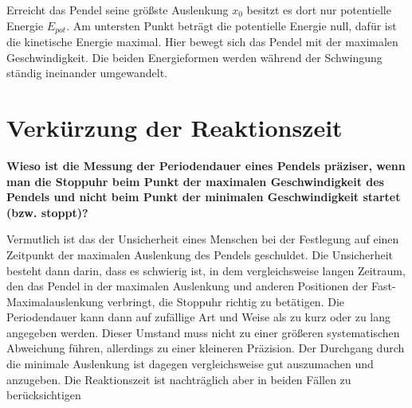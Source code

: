 \documentclass[a4paper, 12pt]{article}
\begin{document}
Erreicht das Pendel seine größste Auslenkung $x_0$ besitzt es dort nur potentielle Energie $E_{pot}$. Am untersten Punkt beträgt die potentielle Energie null, dafür ist die kinetische Energie maximal. Hier bewegt sich das Pendel mit der maximalen Geschwindigkeit. Die beiden Energieformen werden während der Schwingung ständig ineinander umgewandelt.

\section{Verkürzung der Reaktionszeit}
\textbf{Wieso ist die Messung der Periodendauer eines Pendels präziser, wenn man die Stoppuhr beim Punkt der maximalen Geschwindigkeit des Pendels und nicht beim Punkt der minimalen Geschwindigkeit startet (bzw. stoppt)?}

Vermutlich ist das der Unsicherheit eines Menschen bei der Festlegung auf einen Zeitpunkt der maximalen Auslenkung des Pendels geschuldet. Die Unsicherheit besteht dann darin, dass es schwierig ist, in dem vergleichsweise langen Zeitraum, den das Pendel in der maximalen Auslenkung und anderen Positionen der Fast-Maximalauslenkung verbringt, die Stoppuhr richtig zu betätigen. Die Periodendauer kann dann auf zufällige Art und Weise als zu kurz oder zu lang angegeben werden. Dieser Umstand muss nicht zu einer größeren systematischen Abweichung führen, allerdings zu einer kleineren Präzision. Der Durchgang durch die minimale Auslenkung ist dagegen vergleichsweise gut auszumachen und anzugeben. Die Reaktionszeit ist
nachträglich aber in beiden Fällen zu berücksichtigen
\end{document}
